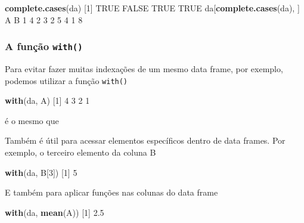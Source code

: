 \documentclass[10pt,a4paper]{book}
\newenvironment{Shaded}{\begin{snugshade}}{\end{snugshade}}
\newcommand{\KeywordTok}[1]{\textcolor[rgb]{0.13,0.29,0.53}{\textbf{#1}}}
\newcommand{\DecValTok}[1]{\textcolor[rgb]{0.00,0.00,0.81}{#1}}
\newcommand{\FloatTok}[1]{\textcolor[rgb]{0.00,0.00,0.81}{#1}}
\newcommand{\OtherTok}[1]{\textcolor[rgb]{0.56,0.35,0.01}{#1}}
\newcommand{\OperatorTok}[1]{\textcolor[rgb]{0.81,0.36,0.00}{\textbf{#1}}}
\newcommand{\NormalTok}[1]{#1}
\begin{document}
\begin{Shaded}
\begin{Highlighting}[]
\KeywordTok{complete.cases}\NormalTok{(da)}
\NormalTok{[}\DecValTok{1}\NormalTok{]  }\OtherTok{TRUE} \OtherTok{FALSE}  \OtherTok{TRUE}  \OtherTok{TRUE}
\NormalTok{da[}\KeywordTok{complete.cases}\NormalTok{(da), ]}
\NormalTok{  A B}
\DecValTok{1} \DecValTok{4} \DecValTok{2}
\DecValTok{3} \DecValTok{2} \DecValTok{5}
\DecValTok{4} \DecValTok{1} \DecValTok{8}
\end{Highlighting}
\end{Shaded}

\subsubsection{\texorpdfstring{A função
\texttt{with()}}{A função with()}}\label{a-funcao-with}

Para evitar fazer muitas indexações de um mesmo data frame, por exemplo,
podemos utilizar a função \texttt{with()}

\begin{Shaded}
\begin{Highlighting}[]
\KeywordTok{with}\NormalTok{(da, A)}
\NormalTok{[}\DecValTok{1}\NormalTok{] }\DecValTok{4} \DecValTok{3} \DecValTok{2} \DecValTok{1}
\end{Highlighting}
\end{Shaded}

é o mesmo que

\begin{Shaded}
\end{Shaded}

Também é útil para acessar elementos específicos dentro de data frames.
Por exemplo, o terceiro elemento da coluna B

\begin{Shaded}
\begin{Highlighting}[]
\KeywordTok{with}\NormalTok{(da, B[}\DecValTok{3}\NormalTok{])}
\NormalTok{[}\DecValTok{1}\NormalTok{] }\DecValTok{5}
\end{Highlighting}
\end{Shaded}

E também para aplicar funções nas colunas do data frame

\begin{Shaded}
\begin{Highlighting}[]
\KeywordTok{with}\NormalTok{(da, }\KeywordTok{mean}\NormalTok{(A))}
\NormalTok{[}\DecValTok{1}\NormalTok{] }\FloatTok{2.5}
\end{Highlighting}
\end{Shaded}
\end{document}
